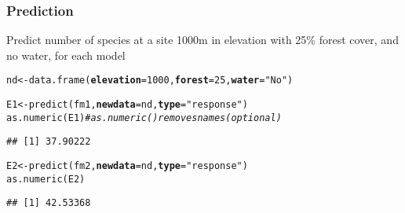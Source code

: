 \documentclass[color=usenames,dvipsnames]{beamer}\usepackage[]{graphicx}\usepackage[]{color}
\makeatletter
\newcommand{\hlnum}[1]{\textcolor[rgb]{0.69,0.494,0}{#1}}%
\newcommand{\hlstr}[1]{\textcolor[rgb]{0.749,0.012,0.012}{#1}}%
\newcommand{\hlcom}[1]{\textcolor[rgb]{0.514,0.506,0.514}{\textit{#1}}}%
\newcommand{\hlstd}[1]{\textcolor[rgb]{0,0,0}{#1}}%
\newcommand{\hlkwb}[1]{\textcolor[rgb]{0,0.341,0.682}{#1}}%
\newcommand{\hlkwc}[1]{\textcolor[rgb]{0,0,0}{\textbf{#1}}}%
\newcommand{\hlkwd}[1]{\textcolor[rgb]{0.004,0.004,0.506}{#1}}%
\newenvironment{kframe}{%
 \def\at@end@of@kframe{}%
 \ifinner\ifhmode%
  \def\at@end@of@kframe{\end{minipage}}%
  \begin{minipage}{\columnwidth}%
 \fi\fi%
 \def\FrameCommand##1{\hskip\@totalleftmargin \hskip-\fboxsep
 \colorbox{shadecolor}{##1}\hskip-\fboxsep
     \hskip-\linewidth \hskip-\@totalleftmargin \hskip\columnwidth}%
 \MakeFramed {\advance\hsize-\width
   \@totalleftmargin\z@ \linewidth\hsize
   \@setminipage}}%
 {\par\unskip\endMakeFramed%
 \at@end@of@kframe}
\newenvironment{knitrout}{}{} %
\makeatother
\begin{document}
\begin{frame}[fragile]
  \frametitle{Prediction}
  \footnotesize
  {Predict number of species at a site 1000m in elevation with 25\% forest
    cover, and no water, for \alert{each} model}
\begin{knitrout}\footnotesize
{}\color{fgcolor}\begin{kframe}
\begin{alltt}
\hlstd{nd} \hlkwb{<-} \hlkwd{data.frame}\hlstd{(}\hlkwc{elevation}\hlstd{=}\hlnum{1000}\hlstd{,} \hlkwc{forest}\hlstd{=}\hlnum{25}\hlstd{,} \hlkwc{water}\hlstd{=}\hlstr{"No"}\hlstd{)}
\end{alltt}
\end{kframe}
\end{knitrout}
\pause
\vfill
\begin{knitrout}\footnotesize
{}\color{fgcolor}\begin{kframe}
\begin{alltt}
\hlstd{E1} \hlkwb{<-} \hlkwd{predict}\hlstd{(fm1,} \hlkwc{newdata}\hlstd{=nd,} \hlkwc{type}\hlstd{=}\hlstr{"response"}\hlstd{)}
\hlkwd{as.numeric}\hlstd{(E1)} \hlcom{# as.numeric() removes names (optional)}
\end{alltt}
\begin{verbatim}
## [1] 37.90222
\end{verbatim}
\end{kframe}
\end{knitrout}
\pause
\vfill
\begin{knitrout}\footnotesize
{}\color{fgcolor}\begin{kframe}
\begin{alltt}
\hlstd{E2} \hlkwb{<-} \hlkwd{predict}\hlstd{(fm2,} \hlkwc{newdata}\hlstd{=nd,} \hlkwc{type}\hlstd{=}\hlstr{"response"}\hlstd{)}
\hlkwd{as.numeric}\hlstd{(E2)}
\end{alltt}
\begin{verbatim}
## [1] 42.53368
\end{verbatim}
\end{kframe}
\end{knitrout}
\pause
\vfill
\begin{knitrout}\footnotesize
{}\color{fgcolor}\begin{kframe}
\begin{alltt}

\end{alltt}
\end{kframe}
\end{knitrout}
\end{frame}
\end{document}
